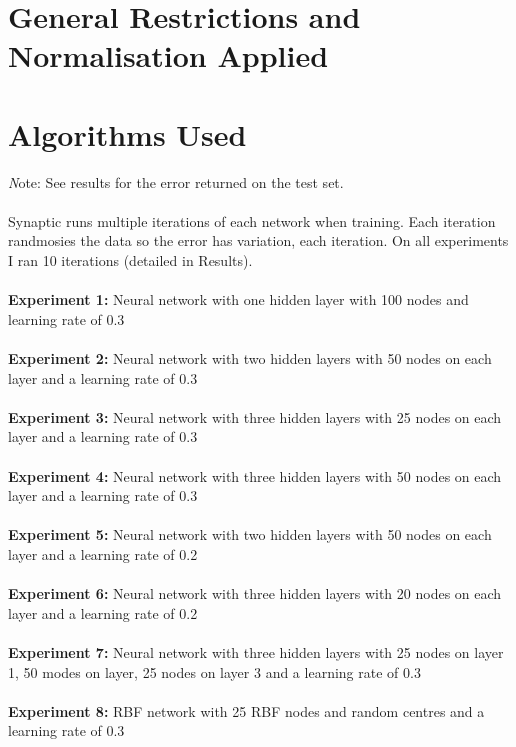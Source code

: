 \documentclass[11pt]{article}
\begin{document}
\begin{page}
\section{General Restrictions and Normalisation Applied}


\section{Algorithms Used}
\emph Note: See results for the error returned on the test set.\\\\
 
Synaptic runs multiple iterations of each network when training. Each iteration randmosies the data so the error has variation, each iteration. On all experiments I ran 10 iterations (detailed in Results).\\\\

\textbf{Experiment 1:} Neural network with one hidden layer with 100 nodes and learning rate of 0.3\\\\
\textbf{Experiment 2:} Neural network with two hidden layers with 50 nodes on each layer and a learning rate of 0.3\\\\
\textbf{Experiment 3:} Neural network with three hidden layers with 25 nodes on each layer and a learning rate of 0.3\\\\
\textbf{Experiment 4:} Neural network with three hidden layers with 50 nodes on each layer and a learning rate of 0.3\\\\
\textbf{Experiment 5:} Neural network with two hidden layers with 50 nodes on each layer and a learning rate of 0.2\\\\
\textbf{Experiment 6:} Neural network with three hidden layers with 20 nodes on each layer and a learning rate of 0.2\\\\
\textbf{Experiment 7:} Neural network with three hidden layers with 25 nodes on layer 1, 50 modes on layer, 25 nodes on layer 3 and a learning rate of 0.3\\\\
\textbf{Experiment 8:} RBF network with 25 RBF nodes and random centres and a learning rate of 0.3\\\\


\end{page}
\end{document}
